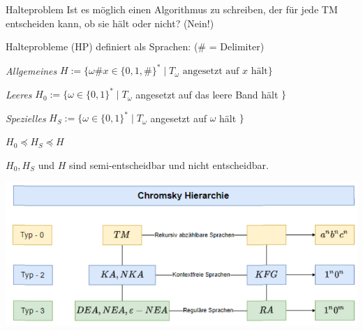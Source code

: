\begin{concept}{Halteproblem}
    Ist es möglich einen Algorithmus zu schreiben, der für jede TM entscheiden kann, ob sie hält oder nicht? (Nein!)
    
    \vspace*{1mm}

    Halteprobleme (HP) definiert als Sprachen: {\small(\# = Delimiter)}

    \vspace*{1mm}

    \emph{Allgemeines} $H :=\{\omega \# x \in\{0,1, \#\}^{*} \mid T_{\omega} \text{ angesetzt auf } x \text{ hält} \}$

    \emph{Leeres} $H_{0}:=\{\omega \in\{0,1\}^{*} \mid T_{\omega}$ angesetzt auf das leere Band hält $\}$ 
    
    \emph{Spezielles} $H_{S}:=\{\omega \in\{0,1\}^{*} \mid T_{\omega}$ angesetzt auf $\omega$ hält $\}$

    \vspace*{1mm}

    {\small
    $H_{0} \preccurlyeq H_{S} \preccurlyeq H$

    $H_{0}, H_{S}$ und $H$ sind semi-entscheidbar und nicht entscheidbar.
    }
\end{concept}

\begin{center}
\includegraphics[width=1\linewidth]{chomsky_hierarchie.png}
\end{center}